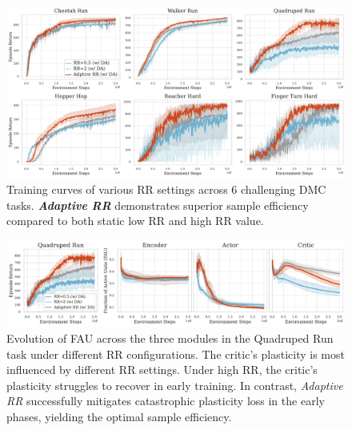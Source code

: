 \begin{figure}[ht]
  \centering
  \vspace{-0.5\baselineskip}
  \includegraphics[width=\textwidth]{Figures/4Solutions/ARR_Results.pdf} 
  \vspace{-1.5\baselineskip}
    \caption{Training curves of various RR settings across 6 challenging DMC tasks. \textcolor{AARed}{\textbf{\textit{Adaptive RR}}} demonstrates superior sample efficiency compared to both static \textcolor{AAGray}{low RR} and \textcolor{AABlue}{high RR} value.}
    \label{fig:arr_main_result}
\end{figure}
\vspace{-\baselineskip}
\begin{figure}[ht]
  \centering
  \vspace{-0.5\baselineskip}
  \includegraphics[width=\textwidth]{Figures/4Solutions/FAU_ARR_QR.pdf}
  \vspace{-1.5\baselineskip}
  \caption{Evolution of FAU across the three modules in the Quadruped Run task under different RR configurations.
  The critic's plasticity is most influenced by different RR settings. Under \textcolor{AABlue}{high RR}, the critic's plasticity struggles to recover in early training.
  In contrast, \textcolor{AARed}{\textit{Adaptive RR}} successfully mitigates catastrophic plasticity loss in the early phases, yielding the optimal sample efficiency.}
  \label{figure:ARR_FAU}
\end{figure}

